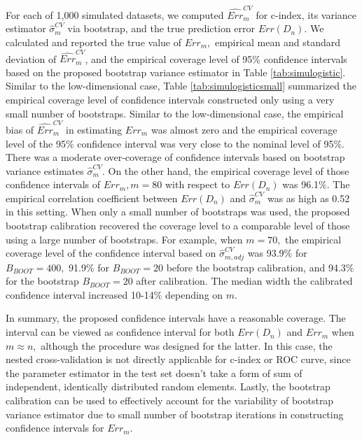 \documentclass[12pt]{article}
\begin{document}
For each of 1,000 simulated datasets, we computed  $\widehat{Err}_m^{CV}$ for c-index, its variance estimator $\hat{\sigma}_m^{CV}$ via bootstrap, and the true prediction error $Err(D_n).$ We calculated and reported the true value of $Err_m,$ empirical mean and standard deviation of $\widehat{Err}_m^{CV}$, and the empirical coverage level of 95\% confidence intervals based on the proposed bootstrap variance estimator in Table \ref{tab:simulogistic}.  Similar to the low-dimensional case, Table \ref{tab:simulogisticsmall} summarized the empirical coverage level of confidence intervals constructed only using a very small number of bootstraps. Similar to the low-dimensional case, the empirical bias of $\widehat{Err}_m^{CV}$ in estimating $Err_m$ was almost zero and the empirical coverage level of the 95\% confidence interval was very close to the nominal level of 95\%. There was a moderate over-coverage of confidence intervals based on bootstrap variance estimates $\widehat{\sigma}_m^{CV}.$  On the other hand, the empirical coverage level of those confidence intervals of $Err_m, m=80$ with respect to $Err(D_n)$ was 96.1\%. The empirical correlation coefficient between $Err(D_n)$ and $\widehat{\sigma}_m^{CV}$ was as high as 0.52 in this setting. When only a small number of bootstraps was used,  the proposed bootstrap calibration recovered the coverage level to a comparable level of those using a large number of bootstraps. For example, when $m=70,$ the empirical coverage level of the confidence interval based on $\widehat{\sigma}_{m, adj}^{CV}$ was 93.9\% for $B_{BOOT}=400,$  91.9\% for $B_{BOOT}=20$ before the bootstrap calibration, and 94.3\% for the bootstrap $B_{BOOT}=20$ after calibration. The median width the calibrated confidence interval increased 10-14\% depending on $m$.


In summary, the proposed confidence intervals have a reasonable coverage. The interval can be viewed as confidence interval for both $Err(D_n)$ and $Err_m$ when $m\approx n,$ although the procedure was designed for the latter. In this case, the nested cross-validation is not directly applicable for c-index or ROC curve, since the parameter estimator in the test set doesn't take a form of sum of independent, identically distributed random elements. Lastly, the bootstrap calibration can be used to effectively account for the variability of bootstrap variance estimator due to small number of bootstrap iterations in constructing confidence intervals for $Err_m.$ 

\end{document}
